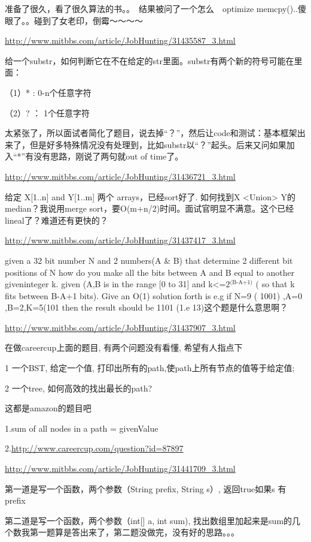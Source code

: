 \documentclass[12pt]{book}
\begin{document}
准备了很久，看了很久算法的书。。　结果被问了一个怎么　optimize memcpy()..傻眼了。。碰到了女老印，倒霉～～～～

\url{http://www.mitbbs.com/article/JobHunting/31435587_3.html}

给一个substr，如何判断它在不在给定的str里面。substr有两个新的符号可能在里面：

（1）* : 0-n个任意字符

（2）? ： 1个任意字符

太紧张了，所以面试者简化了题目，说去掉“？”，然后让code和测试：基本框架出来了，但是好多特殊情况没有处理到，比如substr以“？”起头。后来又问如果加入“*”有没有思路，刚说了两句就out of time了。

\url{http://www.mitbbs.com/article/JobHunting/31436721_3.html}

给定 X[1..n] and Y[1..m] 两个 arrays，已经sort好了. 如何找到X <Union> Y的median？我说用merge sort，要O(m+n/2)时间。面试官明显不满意。这个已经 lineal了？难道还有更快的？

\url{http://www.mitbbs.com/article/JobHunting/31437417_3.html}

given a 32 bit number N and 2 numbers(A \& B) that determine 2
different bit positions of N how do you make all the bits between A
and B equal to another giveninteger k. given (A,B is in the range [0
to 31] and k<=2$^{\text{(B-A+1)}}$ ( so that k fits between B-A+1 bits). Give an
O(1) solution forth is e.g if N=9 ( 1001) ,A=0 ,B=2,K=5(101 then the result should be 1101 (1.e 13)这个题是什么意思啊？

\url{http://www.mitbbs.com/article/JobHunting/31437907_3.html}

在做careercup上面的题目, 有两个问题没有看懂, 希望有人指点下

1 一个BST, 给定一个值, 打印出所有的path,使path上所有节点的值等于给定值;

2 一个tree, 如何高效的找出最长的path? 

这都是amazon的题目吧

1.sum of all nodes in a path  = givenValue

2.\url{http://www.careercup.com/question?id=87897}

\url{http://www.mitbbs.com/article/JobHunting/31441709_3.html}

第一道是写一个函数，两个参数（String prefix, String s）, 返回true如果s
有prefix

第二道是写一个函数，两个参数（int[] a, int sum), 找出数组里加起来是sum的几个数我第一题算是答出来了，第二题没做完，没有好的思路。。。
\end{document}
